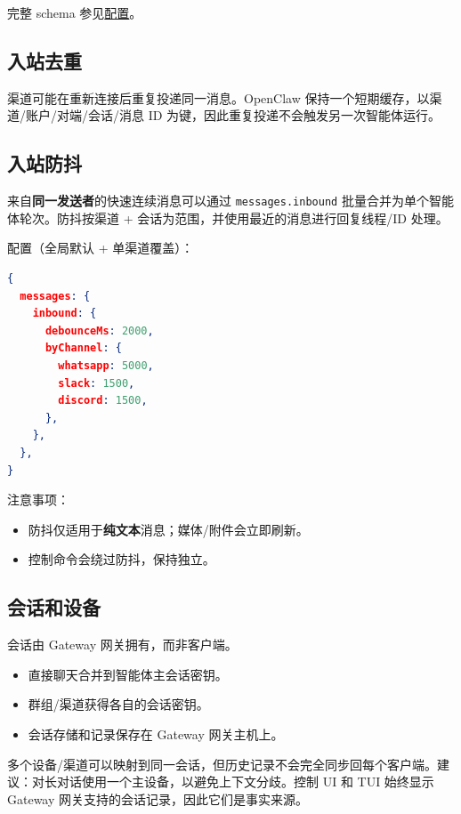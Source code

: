 完整 schema 参见\href{/gateway/configuration}{配置}。

\subsection{入站去重}


渠道可能在重新连接后重复投递同一消息。OpenClaw 保持一个短期缓存，以渠道/账户/对端/会话/消息 ID 为键，因此重复投递不会触发另一次智能体运行。

\subsection{入站防抖}


来自\textbf{同一发送者}的快速连续消息可以通过 \texttt{messages.inbound} 批量合并为单个智能体轮次。防抖按渠道 + 会话为范围，并使用最近的消息进行回复线程/ID 处理。

配置（全局默认 + 单渠道覆盖）：

\begin{lstlisting}[language=json]
{
  messages: {
    inbound: {
      debounceMs: 2000,
      byChannel: {
        whatsapp: 5000,
        slack: 1500,
        discord: 1500,
      },
    },
  },
}
\end{lstlisting}


注意事项：

\begin{itemize}
  \item 防抖仅适用于\textbf{纯文本}消息；媒体/附件会立即刷新。
  \item 控制命令会绕过防抖，保持独立。
\end{itemize}


\subsection{会话和设备}


会话由 Gateway 网关拥有，而非客户端。

\begin{itemize}
  \item 直接聊天合并到智能体主会话密钥。
  \item 群组/渠道获得各自的会话密钥。
  \item 会话存储和记录保存在 Gateway 网关主机上。
\end{itemize}


多个设备/渠道可以映射到同一会话，但历史记录不会完全同步回每个客户端。建议：对长对话使用一个主设备，以避免上下文分歧。控制 UI 和 TUI 始终显示 Gateway 网关支持的会话记录，因此它们是事实来源。

